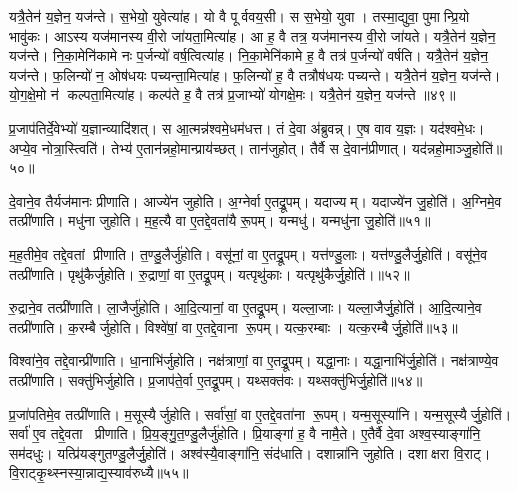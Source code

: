 यत्रै॒तेन॑ य॒ज्ञेन॒ यज॑न्ते। स॒भेयो॒ युवेत्या॑ह। यो वै पूर्ववय॒सी। स स॒भेयो॒ युवा। तस्मा॒द्युवा॒ पुमान्प्रि॒यो भावु॑कः। आऽस्य यज॑मानस्य वी॒रो जा॑यता॒मित्या॑ह। आ ह॒ वै तत्र॒ यज॑मानस्य वी॒रो जा॑यते। यत्रै॒तेन॑ य॒ज्ञेन॒ यज॑न्ते। नि॒का॒मेनि॑कामे नः प॒र्जन्यो॑ वर्\mbox{}ष॒त्वित्या॑ह। नि॒का॒मेनि॑कामे ह॒ वै तत्र॑ प॒र्जन्यो॑ वर्\mbox{}षति। यत्रै॒तेन॑ य॒ज्ञेन॒ यज॑न्ते। फ॒लिन्यो॑ न॒ ओष॑धयः पच्यन्ता॒मित्या॑ह। फ॒लिन्यो॑ ह॒ वै तत्रौष॑धयः पच्यन्ते। यत्रै॒तेन॑ य॒ज्ञेन॒ यज॑न्ते। यो॒ग॒क्षे॒मो न॑ कल्पता॒मित्या॑ह। कल्प॑ते ह॒ वै तत्र॑ प्र॒जाभ्यो॑ योगक्षे॒मः। यत्रै॒तेन॑ य॒ज्ञेन॒ यज॑न्ते ॥४९॥\anuvakamend[अ॒न॒ड्वानित्या॑ह जायते वर्‌षति स॒प्त च॑]

प्र॒जाप॑तिर्दे॒वेभ्यो॑ य॒ज्ञान्व्यादि॑शत्। स आ॒त्मन्न॑श्वमे॒धम॑धत्त। तं दे॒वा अ॑ब्रुवन्न्। ए॒ष वाव य॒ज्ञः। यद॑श्वमे॒धः। अप्ये॒व नोत्रा॒स्त्विति॑। तेभ्य॑ ए॒तान॑न्नहो॒मान्प्राय॑च्छत्। तान॑जुहोत्। तैर्वै स दे॒वान॑प्रीणात्। यद॑न्नहो॒माञ्जु॒होति॑॥५०॥

दे॒वाने॒व तैर्यज॑मानः प्रीणाति। आज्ये॑न जुहोति। अ॒ग्नेर्वा ए॒तद्रू॒पम्। यदाज्यम्। यदाज्ये॑न जु॒होति॑। अ॒ग्निमे॒व तत्प्री॑णाति। मधु॑ना जुहोति। म॒ह॒त्यै वा ए॒तद्दे॒वता॑यै रू॒पम्। यन्मधु॑। यन्मधु॑ना जु॒होति॑॥५१॥

म॒ह॒तीमे॒व तद्दे॒वतां प्रीणाति। त॒ण्डु॒लैर्जु॑होति। वसू॑नां॒ वा ए॒तद्रू॒पम्। यत्त॑ण्डु॒लाः। यत्त॑ण्डु॒लैर्जु॒होति॑। वसू॑ने॒व तत्प्री॑णाति। पृथु॑कैर्जुहोति। रु॒द्राणां॒ वा ए॒तद्रू॒पम्। यत्पृथु॑काः। यत्पृथु॑कैर्जु॒होति॑।॥५२॥

रु॒द्राने॒व तत्प्री॑णाति। ला॒जैर्जु॑होति। आ॒दि॒त्यानां॒ वा ए॒तद्रू॒पम्। यल्ला॒जाः। यल्ला॒जैर्जु॒होति॑। आ॒दि॒त्याने॒व तत्प्री॑णाति। क॒रम्बैर्जुहोति। विश्वे॑षां॒ वा ए॒तद्दे॒वाना रू॒पम्। यत्क॒रम्बाः। यत्क॒रम्बैर्जु॒होति॑॥५३॥

विश्वा॑ने॒व तद्दे॒वान्प्री॑णाति। धा॒नाभि॑र्जुहोति। नक्ष॑त्राणां॒ वा ए॒तद्रू॒पम्। यद्धा॒नाः। यद्धा॒नाभि॑र्जु॒होति॑। नक्ष॑त्राण्ये॒व तत्प्री॑णाति। सक्तु॑भिर्जुहोति। प्र॒जाप॑ते॒र्वा ए॒तद्रू॒पम्। यथ्सक्त॑वः। यथ्सक्तु॑भिर्जु॒होति॑॥५४॥

प्र॒जा॑पतिमे॒व तत्प्री॑णाति। म॒सूस्यैर्जुहोति। सर्वा॑सां॒ वा ए॒तद्दे॒वता॑ना रू॒पम्। यन्म॒सूस्या॑नि। यन्म॒सूस्यैर्जु॒होति॑। सर्वा॑ ए॒व तद्दे॒वता प्रीणाति। प्रि॒य॒ङ्गु॒त॒ण्डु॒लैर्जु॑होति। प्रि॒याङ्गा॑ ह॒ वै नामै॒ते। ए॒तैर्वै दे॒वा अश्व॒स्याङ्गा॑नि॒ सम॑दधुः। यत्प्रि॑यङ्गुतण्डु॒लैर्जु॒होति॑। अश्व॑स्यै॒वाङ्गा॑नि॒ संद॑धाति। दशान्ना॑नि जुहोति। दशाक्षरा वि॒राट्। वि॒राट्कृ॒थ्स्नस्या॒न्नाद्य॒स्याव॑रुध्यै॥५५॥\anuvakamend[जु॒होति॒ मधु॑ना जु॒होति॒ पृथु॑कैर्जु॒होति॑ क॒रम्बैर्जु॒होति॒ सक्तु॑भिर्जु॒होति॑ प्रियङ्गुतण्डु॒लैर्जु॒होति॑ च॒त्वारि॑ च (अ॒न्नहो॒मानाज्ये॑ना॒ग्नेर्मधु॑ना तण़्डु॒लैः पृथु॑कैर्ला॒जैः क॒रम्बैर्धा॒नाभि॒ सक्तु॑भिर्म॒सूस्यै प्रियङ्गुतण्डु॒लैर्द॒शान्ना॑नि॒ द्वाद॑श। )]


